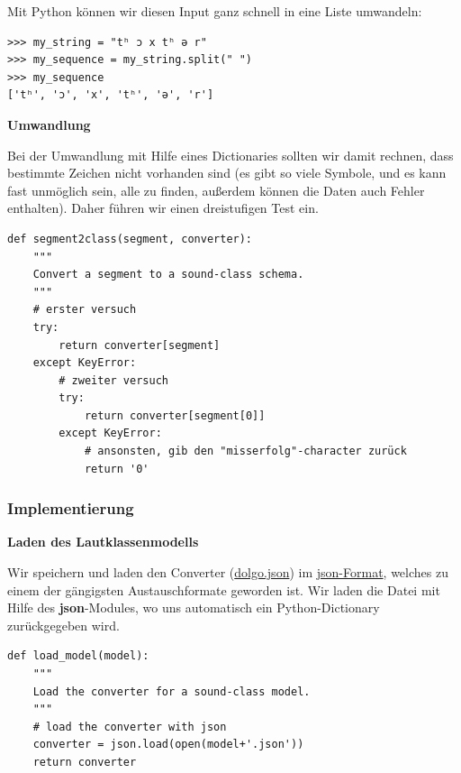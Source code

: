 Mit Python können wir diesen Input ganz schnell in eine Liste umwandeln:

\begin{verbatim}
>>> my_string = "tʰ ɔ x tʰ ə r"
>>> my_sequence = my_string.split(" ")
>>> my_sequence
['tʰ', 'ɔ', 'x', 'tʰ', 'ə', 'r']
\end{verbatim}




\par\noindent\textbf{Umwandlung}

Bei der Umwandlung mit Hilfe eines Dictionaries sollten wir damit
rechnen, dass bestimmte Zeichen nicht vorhanden sind (es gibt so viele
Symbole, und es kann fast unmöglich sein, alle zu finden, außerdem
können die Daten auch Fehler enthalten). Daher führen wir einen
dreistufigen Test ein.

\begin{verbatim}
def segment2class(segment, converter):
    """
    Convert a segment to a sound-class schema.
    """
    # erster versuch
    try:
        return converter[segment]
    except KeyError:
        # zweiter versuch
        try:
            return converter[segment[0]]
        except KeyError:
            # ansonsten, gib den "misserfolg"-character zurück
            return '0' 
\end{verbatim}



\subsubsection{Implementierung}

\par\noindent\textbf{Laden des Lautklassenmodells}

Wir speichern und laden den Converter
(\href{https://github.com/LinguList/pyjs-seminar/blob/master/website/code/dolgo.json}{dolgo.json})
im \href{http://de.wikipedia.org/wiki/json}{json-Format}, welches zu
einem der gängigsten Austauschformate geworden ist. Wir laden die Datei
mit Hilfe des \textbf{json}-Modules, wo uns automatisch ein
Python-Dictionary zurückgegeben wird.

\begin{verbatim}
def load_model(model):
    """
    Load the converter for a sound-class model.
    """
    # load the converter with json
    converter = json.load(open(model+'.json'))
    return converter
\end{verbatim}





